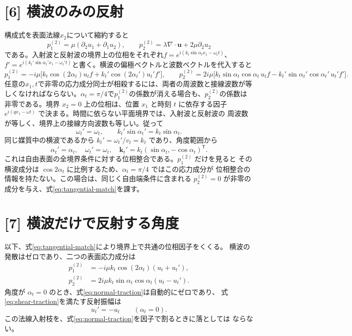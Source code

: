 \documentclass[11pt,a4paper]{article}
\begin{document}
\section*{[6] 横波のみの反射}
構成式を表面法線$x_2$について縮約すると
\begin{equation}
 p_1^{(2)}=\mu(\partial_2u_1+\partial_1u_2),\qquad
 p_2^{(2)}=\lambda\nabla\cdot\boldsymbol u+2\mu\partial_2u_2
\end{equation}
である。入射波と反射波の境界上の位相をそれぞれ$f=e^{i(k_t\sin\alpha_t x_1-\omega_t t)}$、$f'=e^{i(k_t'\sin\alpha_t' x_1-\omega_t't)}$と書く。横波の偏極ベクトルと波数ベクトルを代入すると
\begin{equation}
 p_1^{(2)}=-i\mu\bigl[k_t\cos(2\alpha_t)u_t f
 +k_t'\cos(2\alpha_t')u_t'f'\bigr],\qquad
 p_2^{(2)}=2i\mu\bigl[k_t\sin\alpha_t\cos\alpha_t\,u_t f
 -k_t'\sin\alpha_t'\cos\alpha_t'\,u_t'f'\bigr].
\end{equation}
任意の$x_1,t$で非零の応力成分同士が相殺するには、両者の周波数と接線波数が等しくなければならない。$\alpha_t=\pi/4$で$p_1^{(2)}$の係数が消える場合も、$p_2^{(2)}$の係数は非零である。境界 $x_2=0$ 上の位相は、位置 $x_1$ と時刻 $t$ に依存する因子
$e^{i(qx_1-\omega t)}$ で決まる。時間に依らない平面境界では、入射波と反射波の
周波数が等しく、境界上の接線方向波数も等しい。従って
\begin{equation}
 \omega_t'=\omega_t,\qquad
 k_t'\sin\alpha_t'=k_t\sin\alpha_t.
 \label{eq:tangential-match}
\end{equation}
同じ媒質中の横波であるから $k_t'=\omega_t'/v_t=k_t$ であり、角度範囲から
\begin{equation}
 \boxed{\alpha_t'=\alpha_t,\quad \omega_t'=\omega_t,\quad
        \boldsymbol k_t'=k_t(\sin\alpha_t,-\cos\alpha_t)^{\mathsf T}}.
\end{equation}
これは自由表面の全境界条件に対する位相整合である。$p_1^{(2)}$ だけを見ると
その横波成分は $\cos2\alpha_t$ に比例するため、$\alpha_t=\pi/4$ ではこの応力成分が
位相整合の情報を持たない。この場合は、同じく自由端条件に含まれる
$p_2^{(2)}=0$ が非零の成分を与え、式\eqref{eq:tangential-match}を課す。

\section*{[7] 横波だけで反射する角度}
以下、式\eqref{eq:tangential-match}により境界上で共通の位相因子をくくる。
横波の発散はゼロであり、二つの表面応力成分は
\begin{align}
 p_1^{(2)}&=-i\mu k_t\cos(2\alpha_t)(u_t+u_t'),
 \label{eq:shear-traction}\\
 p_2^{(2)}&=2i\mu k_t\sin\alpha_t\cos\alpha_t(u_t-u_t').
 \label{eq:normal-traction}
\end{align}
角度が $\alpha_t=0$ のとき、式\eqref{eq:normal-traction}は自動的にゼロであり、
式\eqref{eq:shear-traction}を満たす反射振幅は
\begin{equation}
 \boxed{u_t'=-u_t\qquad(\alpha_t=0)}.
\end{equation}
この法線入射枝を、式\eqref{eq:normal-traction}を因子で割るときに落としては
ならない。
\end{document}

